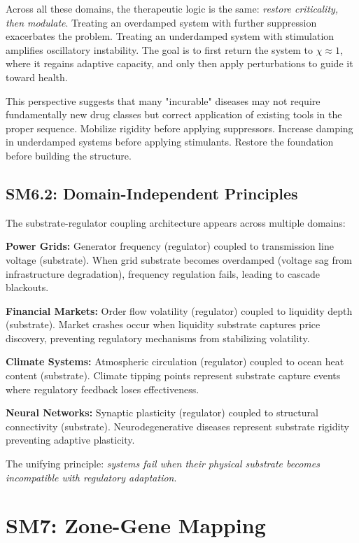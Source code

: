 \documentclass[11pt,letterpaper]{article}
\begin{document}
Across all these domains, the therapeutic logic is the same: \textit{restore criticality, then modulate}. Treating an overdamped system with further suppression exacerbates the problem. Treating an underdamped system with stimulation amplifies oscillatory instability. The goal is to first return the system to $\chi \approx 1$, where it regains adaptive capacity, and only then apply perturbations to guide it toward health.

This perspective suggests that many "incurable" diseases may not require fundamentally new drug classes but correct application of existing tools in the proper sequence. Mobilize rigidity before applying suppressors. Increase damping in underdamped systems before applying stimulants. Restore the foundation before building the structure.

\subsection{SM6.2: Domain-Independent Principles}

The substrate-regulator coupling architecture appears across multiple domains:

\textbf{Power Grids:} Generator frequency (regulator) coupled to transmission line voltage (substrate). When grid substrate becomes overdamped (voltage sag from infrastructure degradation), frequency regulation fails, leading to cascade blackouts.

\textbf{Financial Markets:} Order flow volatility (regulator) coupled to liquidity depth (substrate). Market crashes occur when liquidity substrate captures price discovery, preventing regulatory mechanisms from stabilizing volatility.

\textbf{Climate Systems:} Atmospheric circulation (regulator) coupled to ocean heat content (substrate). Climate tipping points represent substrate capture events where regulatory feedback loses effectiveness.

\textbf{Neural Networks:} Synaptic plasticity (regulator) coupled to structural connectivity (substrate). Neurodegenerative diseases represent substrate rigidity preventing adaptive plasticity.

The unifying principle: \textit{systems fail when their physical substrate becomes incompatible with regulatory adaptation}.

\section{SM7: Zone-Gene Mapping}
\end{document}
